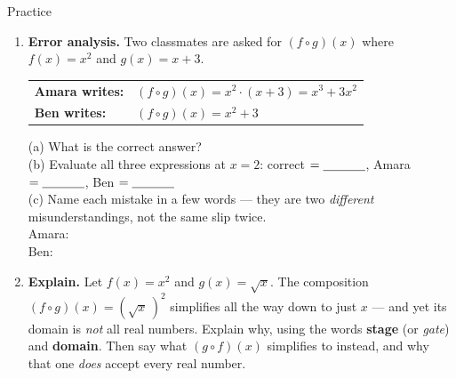 \documentclass[10pt]{article}
\begin{document}
\begin{notesbox}{Practice}
\begin{enumerate}[leftmargin=1.9em, itemsep=11pt]
  \item \textbf{Error analysis.} Two classmates are asked for $(f\circ g)(x)$ where $f(x)=x^{2}$ and
        $g(x)=x+3$.
    \begin{center}
    \begin{tcolorbox}[colback=white, colframe=charcoal!45, boxrule=0.7pt, arc=1.5mm,
        width=0.72\linewidth, left=3mm, right=3mm, top=1.5mm, bottom=1.5mm]
    \centering\small
    \renewcommand{\arraystretch}{1.4}
    \begin{tabular}{@{}l l@{}}
    \textbf{Amara writes:} & $(f\circ g)(x)=x^{2}\cdot(x+3)=x^{3}+3x^{2}$ \\
    \textbf{Ben writes:} & $(f\circ g)(x)=x^{2}+3$ \\
    \end{tabular}
    \end{tcolorbox}
    \end{center}
    \vspace{-4pt}
    (a) What is the correct answer? \blank{4.0cm} \\[3pt]
    (b) Evaluate all three expressions at $x=2$: correct $=\blank{1.2cm}$, Amara $=\blank{1.2cm}$,
    Ben $=\blank{1.2cm}$ \\[3pt]
    (c) Name each mistake in a few words --- they are two \emph{different} misunderstandings, not
    the same slip twice. \\[2pt]
    Amara: \blank{5.4cm} \\[3pt]
    Ben: \blank{5.4cm}

  \item \textbf{Explain.} Let $f(x)=x^{2}$ and $g(x)=\sqrt{x}$. The composition
        $(f\circ g)(x)=\left(\sqrt{x}\,\right)^{2}$ simplifies all the way down to just $x$ --- and
        yet its domain is \emph{not} all real numbers. Explain why, using the words \textbf{stage}
        (or \emph{gate}) and \textbf{domain}. Then say what $(g\circ f)(x)$ simplifies to instead,
        and why that one \emph{does} accept every real number. 
\end{enumerate}
\end{notesbox}
\end{document}
